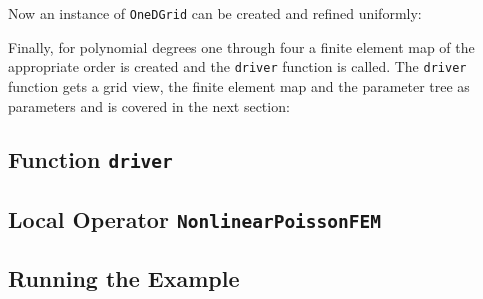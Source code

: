 \documentclass[a4paper,12pt]{article}
\begin{document}
Now an instance of \lstinline{OneDGrid} can be created and
refined uniformly:


Finally, for polynomial degrees one through four a finite element
map of the appropriate order is created and the \lstinline{driver} function
is called. The \lstinline{driver} function gets a grid view, the finite element map
and the parameter tree as parameters and is covered in the next section: 


\subsection{Function \lstinline{driver}}

\subsection{Local Operator \lstinline{NonlinearPoissonFEM}}

\subsection{Running the Example}



\end{document}
